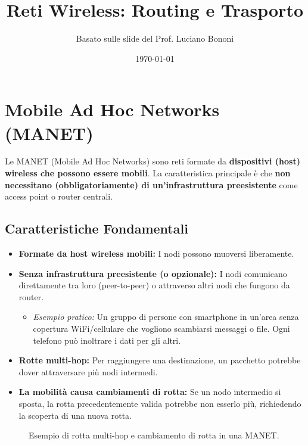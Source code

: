 \documentclass{article}
\title{Reti Wireless: Routing e Trasporto}
\author{Basato sulle slide del Prof. Luciano Bononi}
\date{\today}
\begin{document}
\maketitle
\tableofcontents
\newpage

\section{Mobile Ad Hoc Networks (MANET)}

Le MANET (Mobile Ad Hoc Networks) sono reti formate da \textbf{dispositivi (host) wireless che possono essere mobili}. La caratteristica principale è che \textbf{non necessitano (obbligatoriamente) di un'infrastruttura preesistente} come access point o router centrali.

\subsection{Caratteristiche Fondamentali}
\begin{itemize}
    \item \textbf{Formate da host wireless mobili:} I nodi possono muoversi liberamente.
    \item \textbf{Senza infrastruttura preesistente (o opzionale):} I nodi comunicano direttamente tra loro (peer-to-peer) o attraverso altri nodi che fungono da router.
        \begin{itemize}
            \item \textit{Esempio pratico:} Un gruppo di persone con smartphone in un'area senza copertura WiFi/cellulare che vogliono scambiarsi messaggi o file. Ogni telefono può inoltrare i dati per gli altri.
        \end{itemize}
    \item \textbf{Rotte multi-hop:} Per raggiungere una destinazione, un pacchetto potrebbe dover attraversare più nodi intermedi.
    \item \textbf{La mobilità causa cambiamenti di rotta:} Se un nodo intermedio si sposta, la rotta precedentemente valida potrebbe non esserlo più, richiedendo la scoperta di una nuova rotta.
\end{itemize}

\begin{figure}[H]
    \centering
    \caption{Esempio di rotta multi-hop e cambiamento di rotta in una MANET.}
    \label{fig:manet_multihop}
\end{figure}
\end{document}
